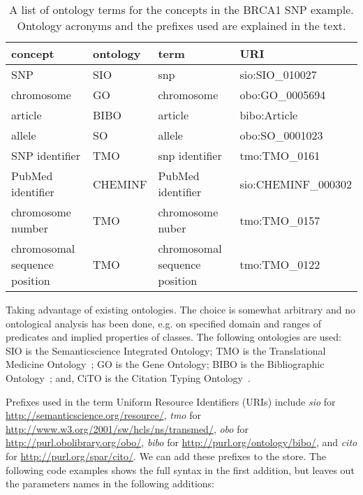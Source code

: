\documentclass[12pt]{article}
\begin{document}
\begin{table}
\caption{A list of ontology terms for the concepts in the BRCA1 SNP example. Ontology acronyms and the prefixes
used are explained in the text.}
\begin{center}
\begin{footnotesize}
\begin{tabular}{l|l|l|l}
 \textbf{concept} & \textbf{ontology} & \textbf{term} & \textbf{URI} \\
\hline
 SNP & SIO & snp & sio:SIO\_010027 \\
 chromosome & GO & chromosome & obo:GO\_0005694 \\
 article &  BIBO & article & bibo:Article \\
 allele & SO & allele & obo:SO\_0001023 \\
 SNP identifier & TMO & snp identifier & tmo:TMO\_0161 \\
 PubMed identifier & CHEMINF & PubMed identifier & sio:CHEMINF\_000302\\
 chromosome number & TMO & chromosome nuber & tmo:TMO\_0157 \\
 chromosomal sequence position & TMO & chromosomal sequence position & tmo:TMO\_0122 \\
\end{tabular}
\end{footnotesize}
\end{center}
\end{table}

Taking advantage of existing ontologies. The choice is somewhat arbitrary and no ontological
analysis has been done, e.g. on specified domain and ranges of predicates and implied
properties of classes. The following ontologies are used:
SIO is the Semanticscience Integrated Ontology;
TMO is the Translational Medicine Ontology~\cite{Luciano2011};
GO is the Gene Ontology;
BIBO is the Bibliographic Ontology~\cite{d2009bibliographic}; and, 
CiTO is the Citation Typing Ontology~\cite{Shotton2010}.

Prefixes used in the term Uniform Resource Identifiers (URIs) include
\textit{sio} for \url{http://semanticscience.org/resource/},
\textit{tmo} for \url{http://www.w3.org/2001/sw/hcls/ns/transmed/},
\textit{obo} for \url{http://purl.obolibrary.org/obo/},
\textit{bibo} for \url{http://purl.org/ontology/bibo/}, and
\textit{cito} for \url{http://purl.org/spar/cito/}.
We can add these prefixes to the store. The following code examples
shows the full syntax in the first addition, but leaves out the
parameters names in the following additions:
\end{document}
